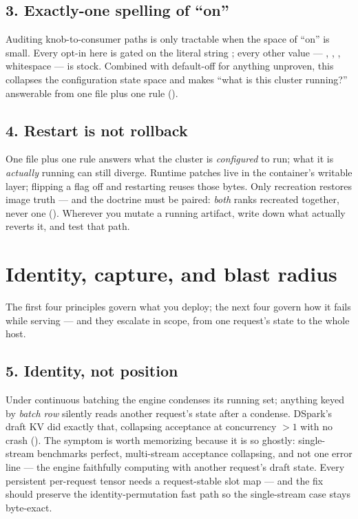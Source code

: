 \subsection*{3. Exactly-one spelling of ``on''}
Auditing knob-to-consumer paths is only tractable when the space of ``on''
is small. Every opt-in here is gated on the literal string ; every other value
--- , , , whitespace --- is stock. Combined with
default-off for anything unproven, this collapses the configuration state
space and makes ``what is this cluster running?'' answerable from one file
plus one rule ().

\subsection*{4. Restart is not rollback}
One file plus one rule answers what the cluster is \emph{configured} to
run; what it is \emph{actually} running can still diverge.
Runtime patches live in the container's writable layer; flipping a flag off
and restarting reuses those bytes. Only recreation restores image truth ---
and the doctrine must be paired: \emph{both} ranks recreated together, never
one (). Wherever you mutate a running artifact, write
down what actually reverts it, and test that path.

\section{Identity, capture, and blast radius}

The first four principles govern what you deploy; the next four govern how
it fails while serving --- and they escalate in scope, from one request's
state to the whole host.

\subsection*{5. Identity, not position}
Under continuous batching the engine condenses its running set; anything
keyed by \emph{batch row} silently reads another request's state after a
condense. DSpark's draft KV did exactly that, collapsing acceptance at
concurrency $>1$ with no crash (). The symptom is
worth memorizing because it is so ghostly: single-stream benchmarks
perfect, multi-stream acceptance collapsing, and not one error line ---
the engine faithfully computing with another request's draft state. Every
persistent
per-request tensor needs a request-stable slot map --- and the fix should
preserve the identity-permutation fast path so the single-stream case stays
byte-exact.

